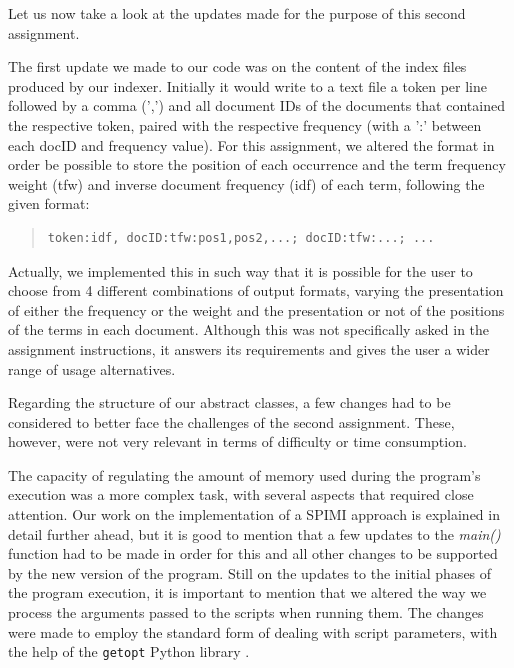 \documentclass[12pt]{article}
\begin{document}
Let us now take a look at the updates made for the purpose of this second 
assignment.

The first update we made to our code was on the content of the index files 
produced by our indexer. Initially it would write to a text file a token
per line followed by a comma (',') and all document IDs of the documents that
contained the respective token, paired with the respective frequency (with
a ':' between each docID and frequency value).
For this assignment, we altered the format in order be possible to store the position
of each occurrence and the term frequency weight (tfw) and inverse document 
frequency (idf) of each term, following the given format:

\begingroup
\addtolength\leftmargini{-0.4in}
\begin{quote}
\begin{verbatim}
token:idf, docID:tfw:pos1,pos2,...; docID:tfw:...; ...
\end{verbatim}
\end{quote}
\endgroup

Actually, we implemented this in such way that it is possible for the user
to choose from 4 different combinations of output formats, varying the 
presentation of either the frequency or the weight and the presentation or
not of the positions of the terms in each document.
Although this was not specifically asked in the assignment instructions,
it answers its requirements and gives the user a wider range of usage 
alternatives.

Regarding the structure of our abstract classes, a few changes had to be
considered to better face the challenges of the second assignment.
These, however, were not very relevant in terms of difficulty or time
consumption.

The capacity of regulating the amount of memory used during the program's
execution was a more complex task, with several aspects that required close
attention. Our work on the implementation of a SPIMI approach is explained
in detail further ahead, but it is good to mention that a few updates to 
the {\it main()\/} function had to be made in order for this and all other 
changes to be supported by the new version of the program.
Still on the updates to the initial phases of the program execution, it is
important to mention that we altered the way we process the arguments passed
to the scripts when running them. The changes were made to employ the standard
form of dealing with script parameters, with the help of the \texttt{getopt}
Python library \cite{getopt}.
\end{document}
